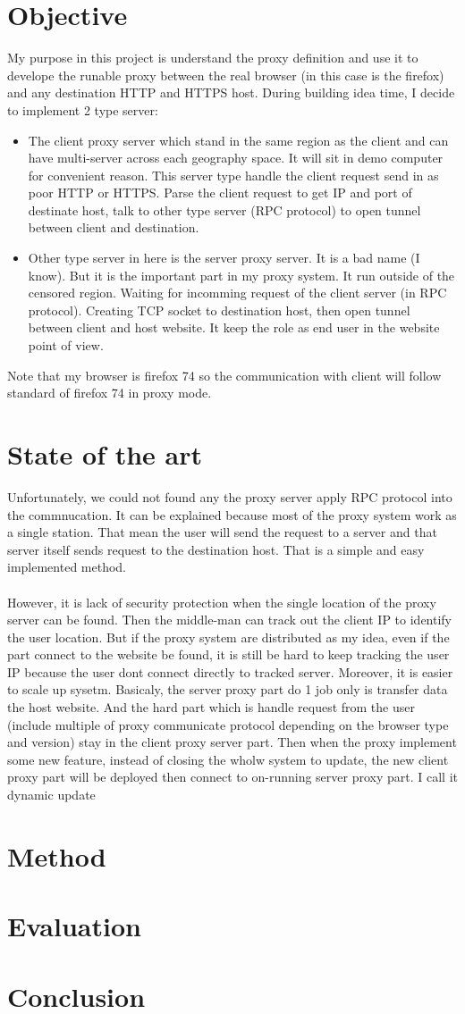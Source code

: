 \documentclass{article}
\begin{document}
\section{Objective}
My purpose in this project is understand the proxy definition
and use it to develope the runable proxy between the real browser
(in this case is the firefox) and any destination HTTP and HTTPS
host. During building idea time, I decide to implement 2 type server:
\begin{itemize}
\item The client proxy server which stand in the same region as
the client and can have multi-server across each geography space.
It will sit in demo computer for convenient reason. This server type
handle the client request send in as poor HTTP or HTTPS. Parse the
client request to get IP and port of destinate host, talk to other
type server (RPC protocol) to open tunnel between client and 
destination.
\item Other type server in here is the server proxy server. 
It is a bad name (I know). But it is the important part in 
my proxy system. It run outside of the censored region. Waiting
for incomming request of the client server (in RPC protocol).
Creating TCP socket to destination host, then open tunnel between
client and host website. It keep the role as end user in the
website point of view.
\end{itemize}
Note that my browser is firefox 74 so the communication with
client will follow standard of firefox 74 in proxy mode.
\section{State of the art}
Unfortunately, we could not found any the proxy server apply
RPC protocol into the commnucation. It can be explained because
most of the proxy system work as a single station. That mean
the user will send the request to a server and that server itself
sends request to the destination host. That is a simple and easy
implemented method.\\
\\
However, it is lack of security protection when the single location
of the proxy server can be found. Then the middle-man can track out
the client IP to identify the user location. But if the proxy system
are distributed as my idea, even if the part connect to the website
be found, it is still be hard to keep tracking the user IP because
the user dont connect directly to tracked server. Moreover, it is
easier to scale up sysetm. Basicaly, the server proxy part do 1 job
only is transfer data the host website. And the hard part which is
handle request from the user (include multiple of proxy communicate
protocol depending on the browser type and version) stay in the client
proxy server part. Then when the proxy implement
some new feature, instead of closing the wholw system to update,
the new client proxy part will be deployed then connect to on-running
server proxy part. I call it dynamic update
\section{Method}
\section{Evaluation}
\section{Conclusion}
\end{document}
